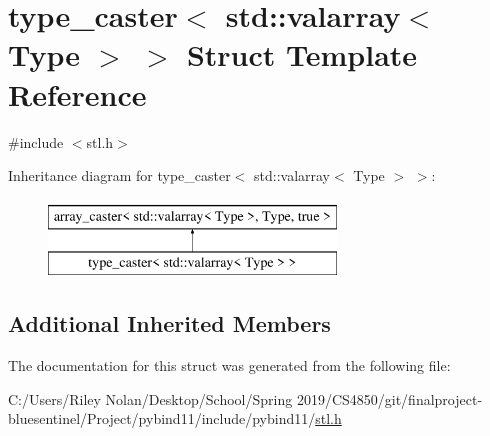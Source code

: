 \hypertarget{structtype__caster_3_01std_1_1valarray_3_01_type_01_4_01_4}{}\section{type\+\_\+caster$<$ std\+::valarray$<$ Type $>$ $>$ Struct Template Reference}
\label{structtype__caster_3_01std_1_1valarray_3_01_type_01_4_01_4}


{\ttfamily \#include $<$stl.\+h$>$}

Inheritance diagram for type\+\_\+caster$<$ std\+::valarray$<$ Type $>$ $>$\+:\begin{figure}[H]
\begin{center}
\leavevmode
\includegraphics[height=2.000000cm]{structtype__caster_3_01std_1_1valarray_3_01_type_01_4_01_4}
\end{center}
\end{figure}
\subsection*{Additional Inherited Members}


The documentation for this struct was generated from the following file\+:\begin{DoxyCompactItemize}
\item 
C\+:/\+Users/\+Riley Nolan/\+Desktop/\+School/\+Spring 2019/\+C\+S4850/git/finalproject-\/bluesentinel/\+Project/pybind11/include/pybind11/\mbox{\hyperlink{stl_8h}{stl.\+h}}\end{DoxyCompactItemize}
